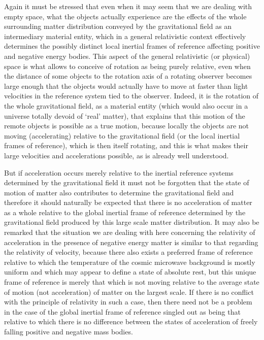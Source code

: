 \documentclass[notitlepage,12pt]{report}
\begin{document}
Again it must be stressed that even when it may seem that we are dealing with empty space, what the objects actually experience are the effects of the whole surrounding matter distribution conveyed by the gravitational field as an intermediary material entity, which in a general relativistic context effectively determines the possibly distinct local inertial frames of reference affecting positive and negative energy bodies. This aspect of the general relativistic (or physical) space is what allows to conceive of rotation as being purely relative, even when the distance of some objects to the rotation axis of a rotating observer becomes large enough that the objects would actually have to move at faster than light velocities in the reference system tied to the observer. Indeed, it is the rotation of the whole gravitational field, as a material entity (which would also occur in a universe totally devoid of `real' matter), that explains that this motion of the remote objects is possible as a true motion, because locally the objects are not moving (accelerating) relative to the gravitational field (or the local inertial frames of reference), which is then itself rotating, and this is what makes their large velocities and accelerations possible, as is already well understood.

But if acceleration occurs merely relative to the inertial reference systems determined by the gravitational field it must not be forgotten that the state of motion of matter also contributes to determine the gravitational field and therefore it should naturally be expected that there is no acceleration of matter as a whole relative to the global inertial frame of reference determined by the gravitational field produced by this large scale matter distribution. It may also be remarked that the situation we are dealing with here concerning the relativity of acceleration in the presence of negative energy matter is similar to that regarding the relativity of velocity, because there also exists a preferred frame of reference relative to which the temperature of the cosmic microwave background is mostly uniform and which may appear to define a state of absolute rest, but this unique frame of reference is merely that which is not moving relative to the average state of motion (not acceleration) of matter on the largest scale. If there is no conflict with the principle of relativity in such a case, then there need not be a problem in the case of the global inertial frame of reference singled out as being that relative to which there is no difference between the states of acceleration of freely falling positive and negative mass bodies.
\end{document}
